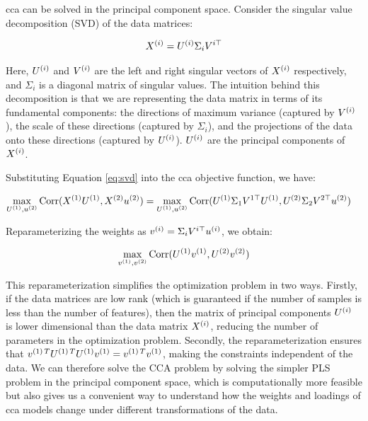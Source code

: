 \acrshort{cca} can be solved in the principal component space.
Consider the singular value decomposition (SVD) of the data matrices:

\begin{align}
    X^{(i)} = U^{(i)}\Sigma_{i}V^{i\top} \label{eq:svd}
\end{align}

Here, $U^{(i)}$ and $V^{(i)}$ are the left and right singular vectors of $X^{(i)}$ respectively, and $\Sigma_{i}$ is a diagonal matrix of singular values.
The intuition behind this decomposition is that we are representing the data matrix in terms of its fundamental components: the directions of maximum variance (captured by $V^{(i)}$), the scale of these directions (captured by $\Sigma_{i}$), and the projections of the data onto these directions (captured by $U^{(i)}$).
$U^{(i)}$ are the principal components of $X^{(i)}$.

Substituting Equation \ref{eq:svd} into the \acrshort{cca} objective function, we have:

\begin{align}
    \max_{U^{(1)}, u^{(2)}} \operatorname{Corr}(X^{(1)}U^{(1)}, X^{(2)}u^{(2)}) &= \max_{U^{(1)}, u^{(2)}} \operatorname{Corr}(U^{(1)}\Sigma_{1}V^{1\top}U^{(1)}, U^{(2)}\Sigma_{2}V^{2\top}u^{(2)}) \label{eq:cca_obj}
\end{align}

Reparameterizing the weights as $v^{(i)} = \Sigma_{i}V^{i\top}u^{(i)}$, we obtain:

\begin{align}
    \max_{v^{(1)}, v^{(2)}} \operatorname{Corr}(U^{(1)}v^{(1)}, U^{(2)}v^{(2)}) \label{eq:reparam}
\end{align}

This reparameterization simplifies the optimization problem in two ways.
Firstly, if the data matrices are low rank (which is guaranteed if the number of samples is less than the number of features), then the matrix of principal components $U^{(i)}$ is lower dimensional than the data matrix $X^{(i)}$, reducing the number of parameters in the optimization problem.
Secondly, the reparameterization ensures that $v^{(1)\,T}U^{(1)\,T}U^{(1)}v^{(1)}=v^{(1)\,T}v^{(1)}$, making the constraints independent of the data.
We can therefore solve the CCA problem by solving the simpler PLS problem in the principal component space, which is computationally more feasible but also gives us a convenient way to understand how the weights and \gls{loadings} of \acrshort{cca} models change under different transformations of the data.


